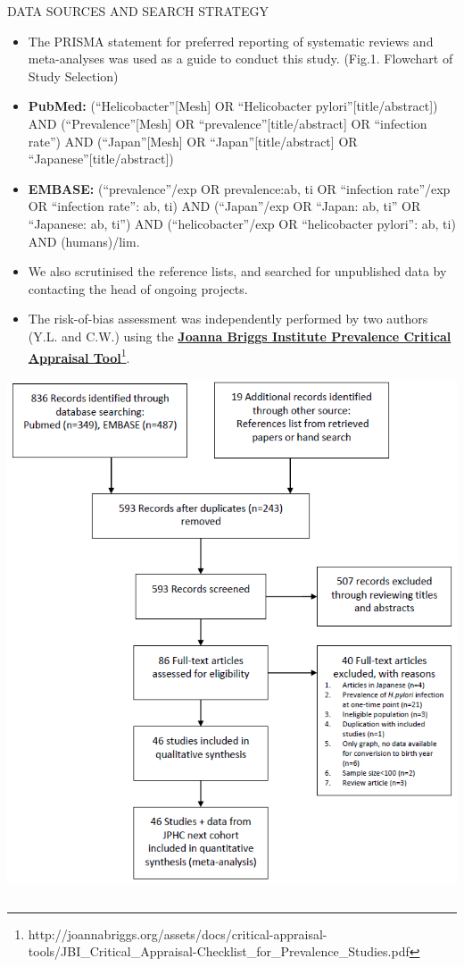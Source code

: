 \documentclass[english,xcolor=table,t
]{beamer}
\begin{document}
\begin{frame}
\begin{columns}
\begin{block}{DATA SOURCES AND SEARCH STRATEGY}
\begin{itemize}
\item
  The PRISMA statement for preferred reporting of systematic reviews and
  meta-analyses was used as a guide to conduct this study. (Fig.1.
  Flowchart of Study Selection)
\item
  \textbf{PubMed: } (\enquote{Helicobacter}{[}Mesh{]} OR
  \enquote{Helicobacter pylori}{[}title/abstract{]}) AND
  (\enquote{Prevalence}{[}Mesh{]} OR
  \enquote{prevalence}{[}title/abstract{]} OR \enquote{infection rate})
  AND (\enquote{Japan}{[}Mesh{]} OR \enquote{Japan}{[}title/abstract{]}
  OR \enquote{Japanese}{[}title/abstract{]})
\item
  \textbf{EMBASE: } (\enquote{prevalence}/exp OR prevalence:ab, ti OR
  \enquote{infection rate}/exp OR \enquote{infection rate}: ab, ti) AND
  (\enquote{Japan}/exp OR \enquote{Japan: ab, ti} OR \enquote{Japanese:
  ab, ti}) AND (\enquote{helicobacter}/exp OR \enquote{helicobacter
  pylori}: ab, ti) AND (humans)/lim.
\item
  We also scrutinised the reference lists, and searched for unpublished
  data by contacting the head of ongoing projects.
\item
  The risk-of-bias assessment was independently performed by two authors
  (Y.L. and C.W.) using the
  \href{http://joannabriggs.org/assets/docs/critical-appraisal-tools/JBI_Critical_Appraisal-Checklist_for_Prevalence_Studies.pdf}{\textbf{Joanna
  Briggs Institute Prevalence Critical Appraisal Tool}}\footnote{http://joannabriggs.org/assets/docs/critical-appraisal-tools/JBI\_Critical\_Appraisal-Checklist\_for\_Prevalence\_Studies.pdf}.
\end{itemize}

\center
\includegraphics[width=890pt]{images/Figure_1.png}


\end{block}
\end{columns}
\end{frame}
\end{document}
